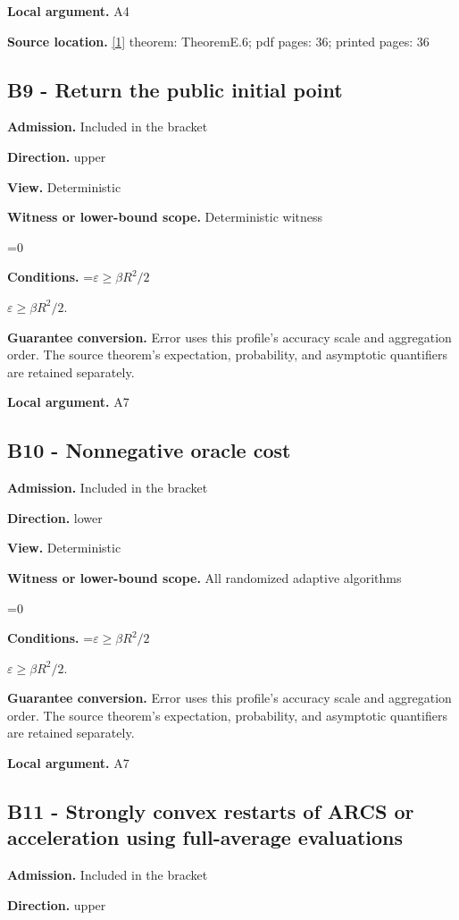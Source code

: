 \documentclass[10pt,a4paper]{article}
\newcommand{\AtlasMath}[1]{\par\begingroup\centering\setbox0=\hbox{$\displaystyle #1$}\ifdim\wd0>1.4\linewidth\typeout{ATLAS WIDE FORMULA: \the\wd0}\fi\ifdim\wd0>\linewidth\resizebox{\linewidth}{!}{\box0}\else\box0\fi\par\endgroup}
\newcommand{\AtlasInlineMath}[1]{\begingroup\setbox0=\hbox{$#1$}\ifdim\wd0>.4\linewidth\endgroup\AtlasMath{#1}\else\endgroup$#1$\fi}
\begin{document}
\textbf{Local argument.} A4

\textbf{Source location.} \href{https://arxiv.org/html/2610.00345v1}{[1]} theorem: TheoremE.6; pdf pages: 36; printed pages: 36

\subsection{B9 - Return the public initial point}
\textbf{Admission.} Included in the bracket

\textbf{Direction.} upper

\textbf{View.} Deterministic

\textbf{Witness or lower-bound scope.} Deterministic witness

\AtlasMath{0}
\textbf{Conditions.} \AtlasInlineMath{\varepsilon\ge\beta R^2/2}.

\textbf{Guarantee conversion.} Error uses this profile's accuracy scale and aggregation order. The source theorem's expectation, probability, and asymptotic quantifiers are retained separately.

\textbf{Local argument.} A7

\subsection{B10 - Nonnegative oracle cost}
\textbf{Admission.} Included in the bracket

\textbf{Direction.} lower

\textbf{View.} Deterministic

\textbf{Witness or lower-bound scope.} All randomized adaptive algorithms

\AtlasMath{0}
\textbf{Conditions.} \AtlasInlineMath{\varepsilon\ge\beta R^2/2}.

\textbf{Guarantee conversion.} Error uses this profile's accuracy scale and aggregation order. The source theorem's expectation, probability, and asymptotic quantifiers are retained separately.

\textbf{Local argument.} A7

\subsection{B11 - Strongly convex restarts of ARCS or acceleration using full-average evaluations}
\textbf{Admission.} Included in the bracket

\textbf{Direction.} upper
\end{document}
